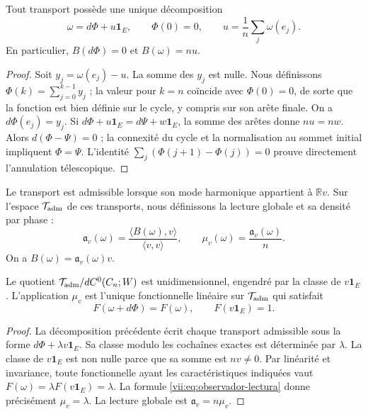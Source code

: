 \begin{theorem}
\label{vii:thm:observador-descomposicion}
Tout transport possède une unique décomposition
\[
 \omega=d\Phi+u\mathbf1_E,\qquad \Phi(0)=0,
 \qquad u=\frac1n\sum_j\omega(e_j).
\]
En particulier, \(B(d\Phi)=0\) et \(B(\omega)=nu\).
\end{theorem}

\begin{proof}
Soit \(y_j=\omega(e_j)-u\). La somme des \(y_j\) est nulle. Nous définissons \(\Phi(k)=\sum_{j=0}^{k-1}y_j\) ; la valeur pour \(k=n\) coïncide avec \(\Phi(0)=0\), de sorte que la fonction est bien définie sur le cycle, y compris sur son arête finale. On a \(d\Phi(e_j)=y_j\). Si \(d\Phi+u\mathbf1_E=d\Psi+w\mathbf1_E\), la somme des arêtes donne \(nu=nw\). Alors \(d(\Phi-\Psi)=0\) ; la connexité du cycle et la normalisation au sommet initial impliquent \(\Phi=\Psi\). L'identité \(\sum_j(\Phi(j+1)-\Phi(j))=0\) prouve directement l'annulation télescopique.
\end{proof}

\begin{definition}
\label{vii:def:observador-admisible}
Le transport est admissible lorsque son mode harmonique appartient à
\(\mathbb Rv\). Sur l'espace \(\mathcal T_{\rm adm}\) de ces
transports, nous définissons la lecture globale et sa densité par phase :
\begin{equation}
 \mathfrak a_v(\omega)
 =\frac{\langle B(\omega),v\rangle}{\langle v,v\rangle},
 \qquad
 \mu_v(\omega)=\frac{\mathfrak a_v(\omega)}n.
 \label{vii:eq:observador-lectura}
\end{equation}
On a \(B(\omega)=\mathfrak a_v(\omega)v\).
\end{definition}

\begin{theorem}
\label{vii:thm:observador-unicidad}
Le quotient
\(\mathcal T_{\rm adm}/dC^0(C_n;W)\) est unidimensionnel, engendré
par la classe de \(v\mathbf1_E\). L'application \(\mu_v\) est l'unique
fonctionnelle linéaire sur \(\mathcal T_{\rm adm}\) qui satisfait
\[
 F(\omega+d\Phi)=F(\omega),\qquad F(v\mathbf1_E)=1.
\]
\end{theorem}

\begin{proof}
La décomposition précédente écrit chaque transport admissible sous la forme
\(d\Phi+\lambda v\mathbf1_E\). Sa classe modulo les cochaînes exactes
est déterminée par \(\lambda\). La classe de \(v\mathbf1_E\)
est non nulle parce que sa somme est \(nv\neq0\). Par linéarité et
invariance, toute fonctionnelle ayant les caractéristiques indiquées vaut
\(F(\omega)=\lambda F(v\mathbf1_E)=\lambda\). La formule
\eqref{vii:eq:observador-lectura} donne précisément \(\mu_v=\lambda\).
La lecture globale est \(\mathfrak a_v=n\mu_v\).
\end{proof}

